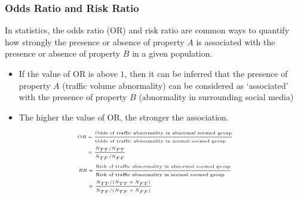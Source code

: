 \begin{frame}
    \frametitle{Odds Ratio and Risk Ratio}
    \small In statistics, the odds ratio (OR) and risk ratio \cite{cornfield1951method,mosteller1968association} are common ways to quantify how strongly the presence or absence of property $A$ is associated with the presence or absence of property $B$ in a given population.
    \begin{itemize} \tiny
        \item If the value of OR is above $1$, then it can be inferred that the presence of property $A$ (traffic volume abnormality) can be considered as `associated' with the presence of property $B$ (abnormality in surrounding social media)
        \item The higher the value of OR, the stronger the association.
    \end{itemize}
    \begin{equation}
        \tiny
        \begin{split}
        OR &= \frac{\text{Odds of traffic abnormality in abnormal socmed group}}{\text{Odds of traffic abnormality in normal socmed group}\hfill} \\
           &= \frac{N_{TT} / N_{FT}}{N_{TF} / N_{FF}}
        \end{split}
        \label{eq:od}
    \end{equation}
    \begin{equation}
        \tiny
        \begin{split}
        RR &=\frac{\text{Risk of traffic abnormality in abnormal socmed group}}{\text{Risk of traffic abnormality in normal socmed group}\hfill} \\
           &= \frac{N_{TT} / (N_{TT} + N_{FT})}{N_{TF} / (N_{TF} + N_{FF})}
        \end{split}
        \label{eq:rr}
    \end{equation}
\end{frame}

